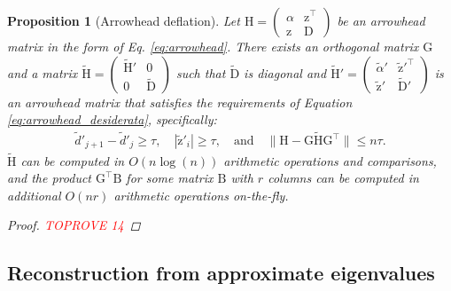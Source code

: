 \documentclass{article}
\newtheorem{proposition}{Proposition}[section]
\newcommand\vecz{\boldsymbol{\mathrm{z}}}
\newcommand\vecztilde{\widetilde{\boldsymbol{\mathrm{z}}}}
\newcommand\matB{\boldsymbol{\mathrm{B}}}
\newcommand\matD{\boldsymbol{\mathrm{D}}}
\newcommand\matG{\boldsymbol{\mathrm{G}}}
\newcommand\matH{\boldsymbol{\mathrm{H}}}
\newcommand\matDtilde{\widetilde{\boldsymbol{\mathrm{D}}}}
\newcommand\matHtilde{\widetilde{\boldsymbol{\mathrm{H}}}}
\begin{document}
\begin{proposition}[Arrowhead deflation]
    \label{proposition:arrowhead_deflation}
    Let $\matH=\begin{pmatrix}
        \alpha & \vecz^\top \\
        \vecz & \matD
    \end{pmatrix}$ be an arrowhead matrix in the form of Eq. \eqref{eq:arrowhead}. There exists an orthogonal matrix $\matG$ and a matrix $\matHtilde=\begin{pmatrix}
        \matHtilde' & 0 \\
        0 & \matDtilde
    \end{pmatrix}$ such that $\matDtilde$ is diagonal and $\matHtilde'=
    \begin{pmatrix}
        \widetilde\alpha' & \vecztilde'^\top \\
        \vecztilde' & \matDtilde'
    \end{pmatrix}
    $
    is an arrowhead matrix that satisfies the requirements of Equation \eqref{eq:arrowhead_desiderata}, specifically:
    \begin{align*}
    \widetilde d'_{j+1}-\widetilde d'_j \geq \tau, \quad
    |\vecztilde'_i|\geq \tau,
    \quad
    \text{and}
    \quad
    \|\matH-\matG\matHtilde\matG^\top\|\leq n\tau.    
    \end{align*}
      $\matHtilde$ can be computed in $O(n\log(n))$ arithmetic operations and comparisons, and the product $\matG^\top\matB$ for some matrix $\matB$ with $r$ columns can be computed in additional $O(nr)$ arithmetic operations on-the-fly.
    \begin{proof}\textcolor{red}{TOPROVE 14}\end{proof}
\end{proposition}


\subsection{Reconstruction from approximate eigenvalues}
\end{document}
